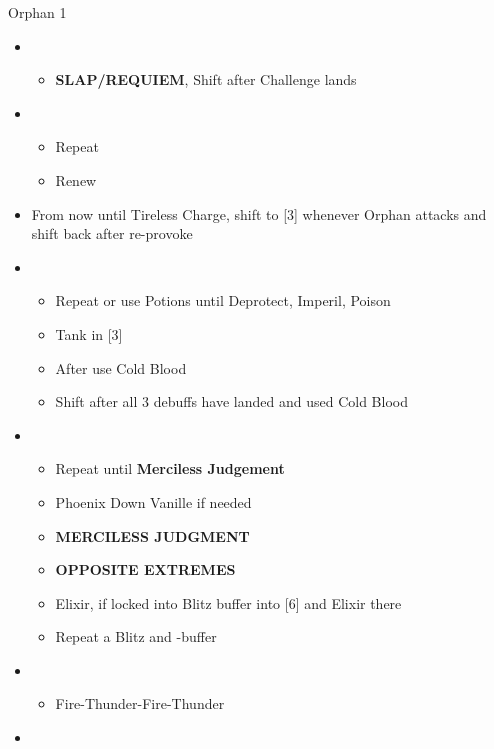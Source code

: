\begin{battle}{Orphan 1}
\begin{multicols}{2}
\begin{itemize}
\begin{itemize}
            \end{itemize}
      \item \third
            \begin{itemize}
              \item \textbf{SLAP/REQUIEM}, Shift after Challenge lands
            \end{itemize}
      \item \fifth
            \begin{itemize}
              \item Repeat
              \item Renew
            \end{itemize}
            \vfill\null
            \columnbreak
      \item From now until Tireless Charge, shift to [3] whenever Orphan attacks and shift back after re-provoke
      \item \fifth
            \begin{itemize}
              \item Repeat or use Potions until Deprotect, Imperil, Poison
              \item Tank in [3]
              \item After \stagger use Cold Blood
              \item Shift after all 3 debuffs have landed and used Cold Blood
            \end{itemize}
      \item \first
            \begin{itemize}
              \item Repeat until \textbf{Merciless Judgement}
              \item Phoenix Down Vanille if needed
              \item \textbf{MERCILESS JUDGMENT}
              \item \textbf{OPPOSITE EXTREMES}
              \item Elixir, if locked into Blitz buffer into [6] and Elixir there
              \item Repeat a Blitz and \rav-buffer
            \end{itemize}
      \item \sixth
            \begin{itemize}
              \item Fire-Thunder-Fire-Thunder
            \end{itemize}
      \item \fourth
            \begin{itemize}

\end{itemize}
\end{itemize}
\end{multicols}
\end{battle}
